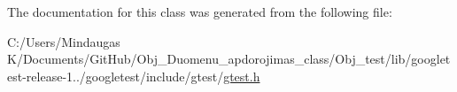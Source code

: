 The documentation for this class was generated from the following file\+:\begin{DoxyCompactItemize}
\item 
C\+:/\+Users/\+Mindaugas K/\+Documents/\+Git\+Hub/\+Obj\+\_\+\+Duomenu\+\_\+apdorojimas\+\_\+class/\+Obj\+\_\+test/lib/googletest-\/release-\/1../googletest/include/gtest/\mbox{\hyperlink{_obj__test_2lib_2googletest-release-1_88_81_2googletest_2include_2gtest_2gtest_8h}{gtest.\+h}}\end{DoxyCompactItemize}
